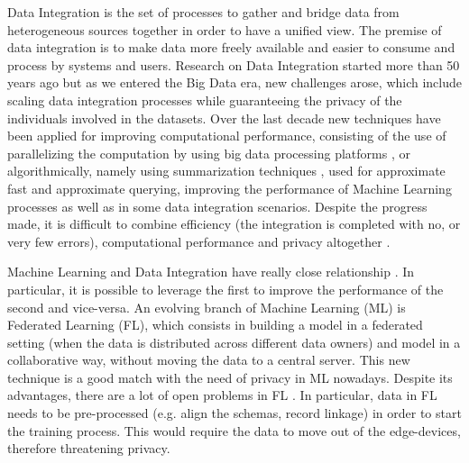 \documentclass[12pt]{article}
\begin{document}
Data Integration is the set of processes to gather and bridge data from heterogeneous sources together in order to 
have a unified view. The premise of data integration is to make data more freely available and easier 
to consume and process by systems and users.
Research on Data Integration started more than 50 years ago \cite*{recordLinkTheory,dataModelIntegration1980} but as we entered the Big Data era, new challenges arose,
 which include scaling \cite*{Dong2013} data integration processes while guaranteeing the privacy \cite*{yu2016big, Gkoulalas-Divanis2021} of the individuals involved in the datasets.
Over the last decade new techniques have been applied for improving computational performance, consisting of the use of parallelizing the computation by using big data processing platforms \cite*{Dong2013},
 or algorithmically, namely using summarization techniques \cite*{Cormode2011}, used for 
approximate fast and approximate querying, improving the performance of Machine Learning processes \cite*{Gribonval2020, Antonanzas2021, Jiang2018} as well as in some data integration scenarios.
Despite the progress made, it is difficult to combine efficiency (the integration is completed with no, or very few errors), computational performance and privacy altogether \cite*{He2017}. 


Machine Learning and Data Integration have really close relationship \cite*{Dong2019}. In particular, it is possible to leverage the first to improve the performance of the second
and vice-versa. An evolving branch of Machine Learning (ML) is Federated Learning (FL), which consists in building a model in a federated setting (when the data is distributed across different data owners) and model in a collaborative way, without moving the data to a central server. This new technique is a good match with the need of privacy in ML nowadays. Despite its advantages, 
 there are a lot of open problems in FL \cite*{Kairouz2021}. In particular, data in FL needs to be pre-processed (e.g. align the schemas, record linkage) in order to start the training process. This would 
 require the data to move out of the edge-devices, therefore threatening privacy.
\end{document}
